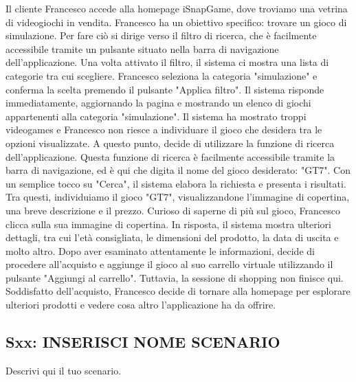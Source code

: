 \documentclass[12pt, a4paper, oneside]{book}
\begin{document}
    Il cliente Francesco accede alla homepage iSnapGame, dove troviamo una vetrina di videogiochi in vendita.
    Francesco ha un obiettivo specifico: trovare un gioco di simulazione. Per fare ciò si dirige verso il filtro di
    ricerca, che è facilmente accessibile tramite un pulsante situato nella barra di navigazione dell'applicazione.
    Una volta attivato il filtro, il sistema ci mostra una lista di categorie tra cui scegliere. Francesco seleziona la
    categoria "simulazione" e conferma la scelta premendo il pulsante "Applica filtro". Il sistema risponde
    immediatamente, aggiornando la pagina e mostrando un elenco di giochi appartenenti alla categoria "simulazione".
    Il sistema ha mostrato troppi videogames e Francesco non riesce a individuare il gioco che desidera tra le opzioni
    visualizzate. A questo punto, decide di utilizzare la funzione di ricerca dell'applicazione. Questa funzione di
    ricerca è facilmente accessibile tramite la barra di navigazione, ed è qui che digita il nome del gioco
    desiderato: "GT7". Con un semplice tocco su "Cerca", il sistema elabora la richiesta e presenta i risultati.
    Tra questi, individuiamo il gioco "GT7", visualizzandone l'immagine di copertina, una breve descrizione e il prezzo.
    Curioso di saperne di più sul gioco, Francesco clicca sulla sua immagine di copertina. In risposta, il sistema
    mostra ulteriori dettagli, tra cui l'età consigliata, le dimensioni del prodotto, la data di uscita e molto altro.
    Dopo aver esaminato attentamente le informazioni, decide di procedere all'acquisto e aggiunge il gioco al suo
    carrello virtuale utilizzando il pulsante "Aggiungi al carrello". Tuttavia, la sessione di shopping non finisce qui.
    Soddisfatto dell'acquisto, Francesco decide di tornare alla homepage per esplorare ulteriori prodotti e vedere cosa
    altro l'applicazione ha da offrire.



    \subsection*{Sxx: INSERISCI NOME SCENARIO}
        Descrivi qui il tuo scenario.
\end{document}
